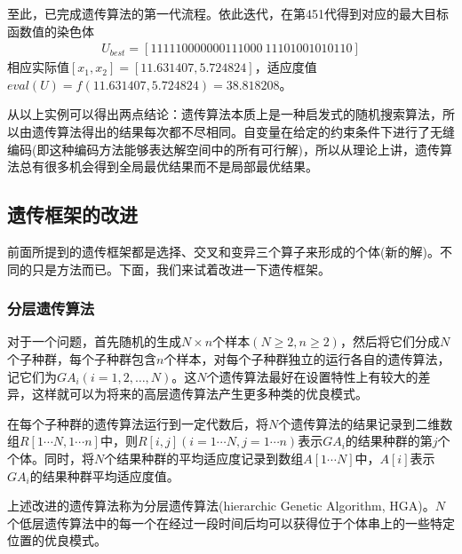             \par
            至此，已完成遗传算法的第一代流程。依此迭代，在第451代得到对应的最大目标函数值的染色体
            \begin{align*}
            U_{best} = [111110000000111000\ 11101001010110]
            \end{align*}
            相应实际值$[x_1,x_2]=[11.631407,5.724824]$，适应度值$eval(U) = f(11.631407,5.724824)=38.818208$。
            \par
            从以上实例可以得出两点结论：遗传算法本质上是一种启发式的随机搜索算法，所以由遗传算法得出的结果每次都不尽相同。自变量在给定的约束条件下进行了无缝编码(即这种编码方法能够表达解空间中的所有可行解)，所以从理论上讲，遗传算法总有很多机会得到全局最优结果而不是局部最优结果。


    \subsection{遗传框架的改进}
        \par
        前面所提到的遗传框架都是选择、交叉和变异三个算子来形成的个体(新的解)。不同的只是方法而已。下面，我们来试着改进一下遗传框架。
        \subsubsection{分层遗传算法}
            \par
            对于一个问题，首先随机的生成$N\times n$个样本$(N \geqslant 2,n \geqslant 2)$，然后将它们分成$N$个子种群，每个子种群包含$n$个样本，对每个子种群独立的运行各自的遗传算法，记它们为$GA_i(i=1,2,\dots,N)$。这$N$个遗传算法最好在设置特性上有较大的差异，这样就可以为将来的高层遗传算法产生更多种类的优良模式。
            \par
            在每个子种群的遗传算法运行到一定代数后，将$N$个遗传算法的结果记录到二维数组$R[1\cdots N,1\cdots n]$中，则$R[i,j](i=1\cdots N,j=1\cdots n)$表示$GA_i$的结果种群的第$j$个个体。同时，将$N$个结果种群的平均适应度记录到数组$A[1\cdots N]$中，$A[i]$表示$GA_i$的结果种群平均适应度值。
            \par
            上述改进的遗传算法称为分层遗传算法(hierarchic Genetic Algorithm, HGA)。$N$个低层遗传算法中的每一个在经过一段时间后均可以获得位于个体串上的一些特定位置的优良模式。
